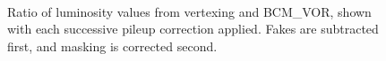 \begin{figure}[h]
	\centering
	\\
	\caption{Ratio of luminosity values from vertexing and BCM\_VOR, shown with each successive pileup correction applied. Fakes are subtracted first, and masking is corrected second.}
	\label{reco-luminosity-vertexing-muscan-corrections}
\end{figure}


